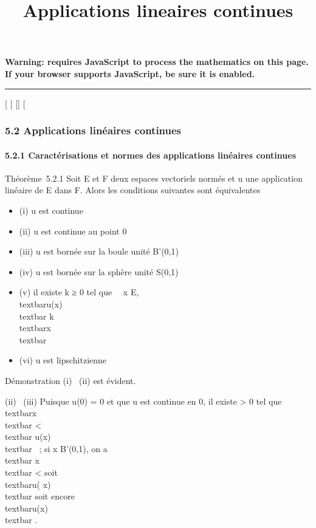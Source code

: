 \documentclass[]{article}
\title{Applications lineaires continues}
\author{}
\date{}
\begin{document}
\maketitle

\textbf{Warning: 
requires JavaScript to process the mathematics on this page.\\ If your
browser supports JavaScript, be sure it is enabled.}

\begin{center}\rule{3in}{0.4pt}\end{center}

{[}
{[}
{[}{]}
{[}

\subsubsection{5.2 Applications linéaires continues}

\paragraph{5.2.1 Caractérisations et normes des applications linéaires
continues}

Théorème~5.2.1 Soit E et F deux espaces vectoriels normés et u une
application linéaire de E dans F. Alors les conditions suivantes sont
équivalentes

\begin{itemize}
\itemsep1pt\parskip0pt
\item
  (i) u est continue
\item
  (ii) u est continue au point 0
\item
  (iii) u est bornée sur la boule unité B'(0,1)
\item
  (iv) u est bornée sur la sphère unité S(0,1)
\item
  (v) il existe k ≥ 0 tel que \forall~~x \in E,
  \\textbar{}u(x)\\textbar{} \leq
  k\\textbar{}x\\textbar{}
\item
  (vi) u est lipschitzienne
\end{itemize}

Démonstration (i) \rigtharrow~(ii) est évident.

(ii) \rigtharrow~(iii) Puisque u(0) = 0 et que u est continue en 0, il existe \eta
\textgreater{} 0 tel que
\\textbar{}x\\textbar{} \textless{} \eta
\rigtharrow~\\textbar{} u(x)\\textbar{} ~; si x \in
B'(0,1), on a \\textbar{} \eta {}
x\\textbar{} \leq \eta {} \textless{} \eta
soit \\textbar{}u( \eta {}
x)\\textbar{}  soit encore
\\textbar{}u(x)\\textbar{} 
\over \eta .
\end{document}
